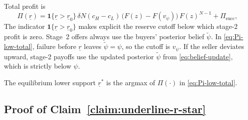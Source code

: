 Total profit is
\begin{equation}
  \Pi(\underline{r})
  = \mathbf{1}\{\underline{r}>\underline{r}_0\}\,
    \delta N (c_H - c_L)\,
    \bigl(F(z) - F(v_{\psi})\bigr)\,
    F(z)^{N-1}
    + \Pi_{\text{succ}},
  \label{eq:Pi-low-total}
\end{equation}
The indicator $\mathbf{1}\{\underline{r}>\underline{r}_0\}$ makes explicit the
reserve cutoff below which stage-2 profit is zero.
Stage~2 offers always use the buyers' posterior belief $\tilde{\psi}$.
In \eqref{eq:Pi-low-total}, failure before $\underline{r}$ leaves
$\tilde{\psi}=\psi$, so the cutoff is $v_{\psi}$.
If the seller deviates upward, stage-2 payoffs use the updated posterior
$\tilde{\psi}$ from \eqref{eq:belief-update}, which is strictly below $\psi$.

\begin{claim}
  \label{claim:underline-r-star}
  The equilibrium lower support $\underline{r}^{*}$ is the argmax of
  $\Pi(\cdot)$ in \eqref{eq:Pi-low-total}.
\end{claim}

\subsection{Proof of Claim~\ref{claim:underline-r-star}}
\label{subsec:proof-r-star}

